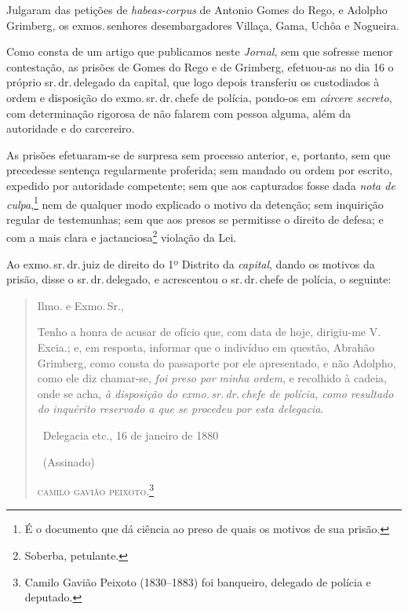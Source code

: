 {
Julgaram das petições de \emph{habeas-corpus} de Antonio Gomes do Rego,
e Adolpho Grimberg, os exmos.\,senhores desembargadores Villaça, Gama,
Uchôa e Nogueira.

Como consta de um artigo que publicamos neste \emph{Jornal}, sem que
sofresse menor contestação, as prisões de Gomes do Rego e de Grimberg,
efetuou-as no dia 16 o próprio sr.\,dr.\,delegado da capital, que logo
depois transferiu os custodiados à ordem e disposição do exmo.\,sr.\,dr.\,chefe de polícia, pondo-os em \emph{cárcere secreto}, com determinação
rigorosa de não falarem com pessoa alguma, além da autoridade e do
carcereiro.

As prisões efetuaram-se de surpresa sem processo anterior, e, portanto,
sem que precedesse sentença regularmente proferida; sem mandado ou ordem
por escrito, expedido por autoridade competente; sem que aos capturados
fosse dada \emph{nota de culpa},\footnote{É o documento que dá ciência
  ao preso de quais os motivos de sua prisão.} nem de qualquer
modo explicado o motivo da detenção; sem inquirição regular de
testemunhas; sem que aos presos se permitisse o direito de defesa; e com
a mais clara e jactanciosa\footnote{Soberba, petulante.} violação da
Lei.

Ao exmo.\,sr.\,dr.\,juiz de direito do 1º Distrito da \emph{capital}, dando
os motivos da prisão, disse o sr.\,dr.\,delegado, e acrescentou o sr.\,dr.\,chefe de polícia, o seguinte:

\begin{quote}

Ilmo. e Exmo.\,Sr.,

Tenho a honra de acusar de ofício que, com data de hoje, dirigiu-me V.
Excia.; e, em resposta, informar que o indivíduo em questão, Abrahão
Grimberg, como consta do passaporte por ele apresentado, e não Adolpho,
como ele diz chamar-se, \emph{foi preso por minha ordem}, e recolhido à
cadeia, onde se acha, \emph{à disposição do exmo.\,sr.\,dr.\,chefe de
polícia, como resultado do inquérito reservado a que se procedeu por
esta delegacia}.\medskip

\hfill\ Delegacia etc., 16 de janeiro de 1880

\hfill\ (Assinado)

\hfill\textsc{camilo gavião peixoto}.\footnote{Camilo Gavião Peixoto (1830--1883)
  foi banqueiro, delegado de polícia e deputado.}
  \end{quote}

}
